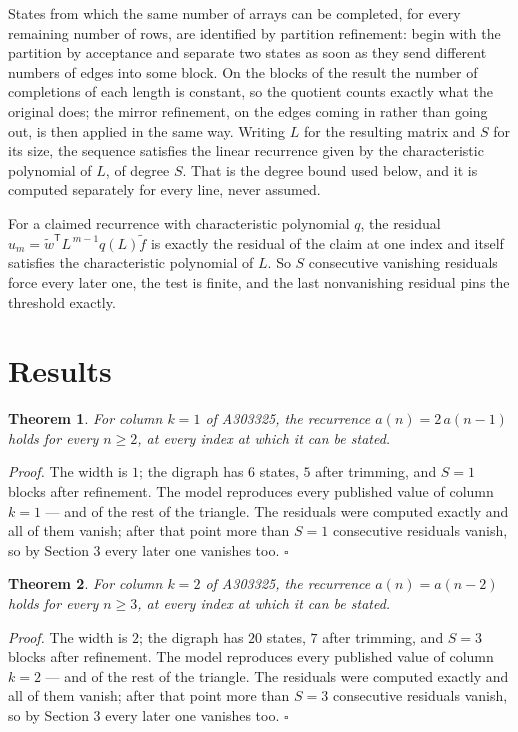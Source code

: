 \documentclass[11pt]{article}
\newtheorem{theorem}{Theorem}
\theoremstyle{definition}
\begin{document}
States from which the same number of arrays can be completed, for every remaining number of rows, are identified by partition refinement: begin with the partition by acceptance and separate two states as soon as they send different numbers of edges into some block. On the blocks of the result the number of completions of each length is constant, so the quotient counts exactly what the original does; the mirror refinement, on the edges coming in rather than going out, is then applied in the same way. Writing $L$ for the resulting matrix and $S$ for its size, the sequence satisfies the linear recurrence given by the characteristic polynomial of $L$, of degree $S$. That is the degree bound used below, and it is computed separately for every line, never assumed.

For a claimed recurrence with characteristic polynomial $q$, the residual $u_m = \tilde w^{\mathsf T}L^{\,m-1}q(L)\tilde f$ is exactly the residual of the claim at one index and itself satisfies the characteristic polynomial of $L$. So $S$ consecutive vanishing residuals force every later one, the test is finite, and the last nonvanishing residual pins the threshold exactly.

\section{Results}

\begin{theorem} For column $k = 1$ of A303325, the recurrence $a(n) = 2\,a(n-1)$ holds for every $n \ge 2$, at every index at which it can be stated.\end{theorem}

{\itshape Proof.} The width is $1$; the digraph has $6$ states, $5$ after trimming, and $S = 1$ blocks after refinement. The model reproduces every published value of column $k = 1$ --- and of the rest of the triangle. The residuals were computed exactly and all of them vanish; after that point more than $S = 1$ consecutive residuals vanish, so by Section 3 every later one vanishes too. $\square$

\begin{theorem} For column $k = 2$ of A303325, the recurrence $a(n) = a(n-2)$ holds for every $n \ge 3$, at every index at which it can be stated.\end{theorem}

{\itshape Proof.} The width is $2$; the digraph has $20$ states, $7$ after trimming, and $S = 3$ blocks after refinement. The model reproduces every published value of column $k = 2$ --- and of the rest of the triangle. The residuals were computed exactly and all of them vanish; after that point more than $S = 3$ consecutive residuals vanish, so by Section 3 every later one vanishes too. $\square$
\end{document}
